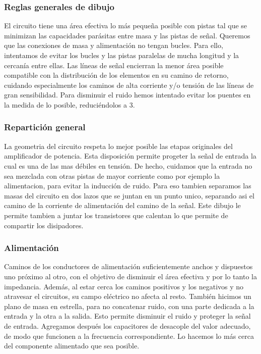 
\subsubsection*{Reglas generales de dibujo}
El circuito tiene una área efectiva lo más pequeña posible con pistas tal que se minimizan las capacidades parásitas entre masa y las pistas de señal.
Queremos que las conexiones de masa y alimentación no tengan bucles. Para ello, intentamos de evitar los bucles y las pistas paralelas de mucha longitud y la cercanía entre ellas.
Las líneas de señal encierran la menor área posible compatible con la distribución de los elementos en su camino de retorno, cuidando especialmente los caminos de alta corriente y/o tensión de las líneas de gran sensibilidad.
Para disminuir el ruido hemos intentado evitar los puentes en la medida de lo posible, reduciéndolos a 3.\\

\subsubsection*{Repartición general}
La geometria del circuito respeta lo mejor posible las etapas originales del amplificador de potencia.  Esta disposición permite progeter la señal de entrada la cual es una de las mas débiles en tensión. De hecho, cuidamos que la entrada no sea mezclada con otras pistas de mayor corriente como por ejemplo la alimentacion, para evitar la inducción de ruido. Para eso tambien separamos las masas del circuito en dos lazos que se juntan en un punto unico, separando asi el camino de la corriente de alimentación del camino de la señal.
Este dibujo le permite tambien a juntar los transistores que calentan lo que permite de compartir los disipadores.
%

\subsubsection*{Alimentación}
Caminos de los conductores de alimentación suficientemente anchos y  dispuestos uno próximo al otro, con el objetivo de disminuir el área efectiva y por lo tanto la impedancia. Además, al estar cerca los caminos positivos y los negativos y no atravesar el circuitos, su campo eléctrico no afecta al resto.
También hicimos un plano de masa en estrella, para no concatenar ruido, con una parte dedicada a la entrada y la otra a la salida. Esto permite disminuir el ruido y proteger la señal de entrada.
 Agregamos después los capacitores de desacople del valor adecuado, de modo que funcionen a la frecuencia correspondiente. Lo hacemos lo más cerca del componente alimentado que sea posible.

